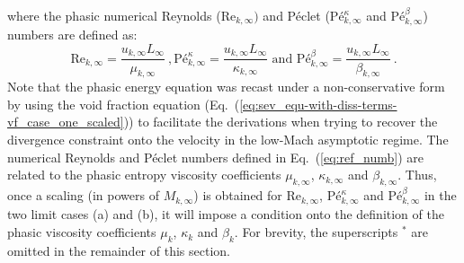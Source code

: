 \documentclass[preprint,10pt]{elsarticle}
\renewcommand{\Re}{\textrm{Re}}
\newcommand{\Pe}{\textrm{P\'e}}
\newcommand{\eqt}[1]{Eq.~(\ref{#1})}                     %
\begin{document}
%
where the phasic numerical Reynolds ($\Re_{k,\infty})$ and P\'eclet ($\Pe_{k,\infty}^\kappa$ and $\Pe_{k,\infty}^\beta$) numbers are defined as:
%
\begin{equation}
\label{eq:ref_numb}
\Re_{k,\infty} = \frac{u_{k,\infty} L_\infty}{\mu_{k,\infty}} \ ,
\Pe_{k,\infty}^\kappa = \frac{u_{k,\infty} L_\infty}{\kappa_{k,\infty}} \text{ and }
\Pe_{k,\infty}^\beta = \frac{u_{k,\infty} L_\infty}{\beta_{k,\infty}} \ .
\end{equation}
%
Note that the phasic energy equation was recast under a non-conservative form by using the void fraction equation (\eqt{eq:sev_equ-with-diss-terms-vf_case_one_scaled}) to facilitate the derivations when trying to recover the divergence constraint onto the velocity in the low-Mach asymptotic regime.
The numerical Reynolds and P\'eclet numbers defined in \eqt{eq:ref_numb} are related to the phasic entropy 
viscosity coefficients $\mu_{k,\infty}$, $\kappa_{k,\infty}$ and $\beta_{k,\infty}$. Thus, once a scaling (in powers of $M_{k,\infty}$) 
is obtained for $\Re_{k,\infty}$, $\Pe_{k,\infty}^\kappa$ and $\Pe_{k,\infty}^\beta$ in the two limit cases (a) and (b), it will impose a condition onto the definition of the phasic viscosity coefficients $\mu_k$, $\kappa_k$ and $\beta_k$. For brevity, the superscripts $^*$ are omitted in the remainder of this section.  
\end{document}
